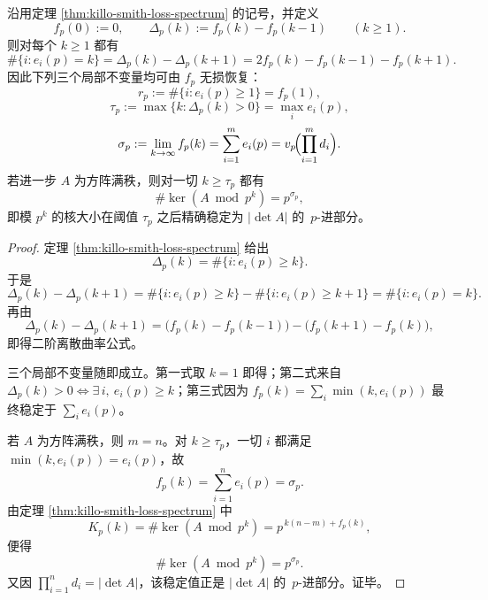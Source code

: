 \begin{corollary}\label{cor:xi-smith-second-discrete-curvature-recovery}
沿用定理 \ref{thm:killo-smith-loss-spectrum} 的记号，并定义
\[
f_p(0):=0,
\qquad
\Delta_p(k):=f_p(k)-f_p(k-1)\qquad(k\ge 1).
\]
则对每个 \(k\ge 1\) 都有
\[
\#\{i:e_i(p)=k\}
=
\Delta_p(k)-\Delta_p(k+1)
=
2f_p(k)-f_p(k-1)-f_p(k+1).
\]
因此下列三个局部不变量均可由 \(f_p\) 无损恢复：
\[
r_p:=\#\{i:e_i(p)\ge 1\}=f_p(1),
\]
\[
\tau_p:=\max\{k:\Delta_p(k)>0\}=\max_i e_i(p),
\]
\[
\sigma_p:=\lim_{k\to\infty}f_p(k)=\sum_{i=1}^{m}e_i(p)=v_p\!\Bigl(\prod_{i=1}^{m}d_i\Bigr).
\]
若进一步 \(A\) 为方阵满秩，则对一切 \(k\ge \tau_p\) 都有
\[
\#\ker(A\bmod p^k)=p^{\sigma_p},
\]
即模 \(p^k\) 的核大小在阈值 \(\tau_p\) 之后精确稳定为 \(|\det A|\) 的 \(\,p\)-进部分。
\end{corollary}
\begin{proof}
定理 \ref{thm:killo-smith-loss-spectrum} 给出
\[
\Delta_p(k)=\#\{i:e_i(p)\ge k\}.
\]
于是
\[
\Delta_p(k)-\Delta_p(k+1)
=
\#\{i:e_i(p)\ge k\}-\#\{i:e_i(p)\ge k+1\}
=
\#\{i:e_i(p)=k\}.
\]
再由
\[
\Delta_p(k)-\Delta_p(k+1)
=
\bigl(f_p(k)-f_p(k-1)\bigr)-\bigl(f_p(k+1)-f_p(k)\bigr),
\]
即得二阶离散曲率公式。

三个局部不变量随即成立。第一式取 \(k=1\) 即得；第二式来自 \(\Delta_p(k)>0\iff \exists\,i,\ e_i(p)\ge k\)；第三式因为 \(f_p(k)=\sum_i\min(k,e_i(p))\) 最终稳定于 \(\sum_i e_i(p)\)。

若 \(A\) 为方阵满秩，则 \(m=n\)。对 \(k\ge \tau_p\)，一切 \(i\) 都满足 \(\min(k,e_i(p))=e_i(p)\)，故
\[
f_p(k)=\sum_{i=1}^{n}e_i(p)=\sigma_p.
\]
由定理 \ref{thm:killo-smith-loss-spectrum} 中
\[
K_p(k)=\#\ker(A\bmod p^k)=p^{\,k(n-m)+f_p(k)},
\]
便得
\[
\#\ker(A\bmod p^k)=p^{\sigma_p}.
\]
又因 \(\prod_{i=1}^{n}d_i=|\det A|\)，该稳定值正是 \(|\det A|\) 的 \(\,p\)-进部分。证毕。
\end{proof}





